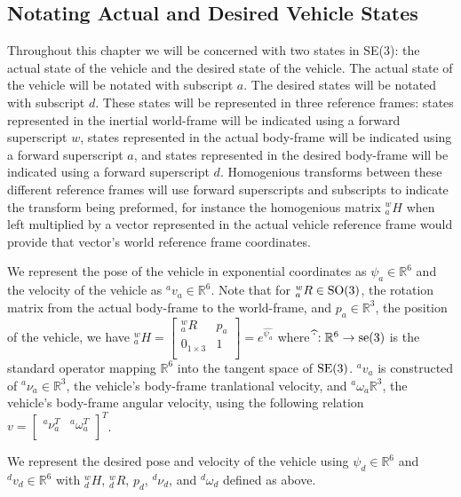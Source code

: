 \subsection{Notating Actual and Desired Vehicle States}

Throughout this chapter we will be concerned with two states in SE(3):
the actual state of the vehicle and the desired state of the vehicle.
%
The actual state of the vehicle will be notated with subscript $a$.  
%
The desired states will be notated with subscript $d$.
%
These states will be represented in three reference frames: states
represented in the inertial world-frame will be indicated using a
forward superscript $w$, states represented in the actual body-frame
will be indicated using a forward superscript $a$, and states
represented in the desired body-frame will be indicated using a
forward superscript $d$.  Homogenious transforms between these
different reference frames will use forward superscripts and
subscripts to indicate the transform being preformed, for instance the
homogenious matrix ${^w_a}H$ when left multiplied by a vector
represented in the actual vehicle reference frame would provide that
vector's world reference frame coordinates.

We represent the pose of the vehicle in exponential coordinates as
$\psi_a\in\mathbb{R}^6$ and the velocity of the vehicle as
${^a}v_a\in\mathbb{R}^6$.  Note that for ${^w_a}R\in\SO3$, the
rotation matrix from the actual body-frame to the world-frame, and
$p_a\in\mathbb{R}^3$, the position of the vehicle, we have
%
${^w_a}H=\left[ \begin{array}{cc}
    {^w_a}R      & p_a  \\
    0_{1 \times 3}  & 1  \\
  \end{array} \right]
=e^{\widehat{\psi_a}}$
%
where $\widehat{\dot{} }:\mathbb{R}^6\to\se3$ is the standard operator
mapping $\mathbb{R}^6$ into the tangent space of $\SE3$.  ${^a}v_a$ is
constructed of ${^a}\nu_a\in\mathbb{R}^3$, the vehicle's body-frame
tranlational velocity, and ${^a}\omega_a\mathbb{R}^3$, the vehicle's
body-frame angular velocity, using the following relation
$v=\left[ \begin{array}{cc} {^a}\nu_a^T & {^a}\omega_a^T
  \\ \end{array} \right]^T$.

We represent the desired pose and velocity of the vehicle using 
$\psi_d\in\mathbb{R}^6$ and ${^d}v_d\in\mathbb{R}^6$ with ${^w_d}H$,
${^w_d}R$, $p_d$, ${^d}\nu_d$, and ${^d}\omega_d$ defined as above.    
